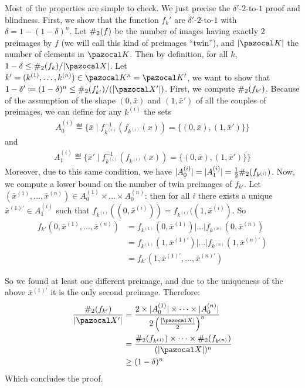 \begin{proofE}
  Most of the properties are simple to check. We just precise the $\delta'$-$2$-to-$1$ proof and blindness. First, we show that the function $f_k'$ are $\delta'$-$2$-to-$1$ with $\delta = 1-(1-\delta)^n$. Let $\#_2(f)$ be the number of images having exactly $2$ preimages by $f$ (we will call this kind of preimages ``twin''), and $|\cK|$ the number of elements in $\cK$. Then by definition, for all $k$, $1- \delta \leq \diese_2(f_k)/|\cX|$. Let $k' = (k^{(1)},\dots,k^{(n)}) \in \cK^n = \cK'$, we want to show that $1-\delta'\eqdef (1-\delta)^n \leq \diese_2(f_{k'}')/(|\cX'|)$. First, we compute $\#_2(f_{k'})$. Because of the assumption of the shape $(0,\bar{x})$ and $(1,\bar{x}')$ of all the couples of preimages, we can define for any $k^{(i)}$ the sets
  \begin{align}
    A_0^{(i)} \eqdef \{\bar{x} \mid f_{k^{(i)}}^{-1}(f_{k^{(i)}}(x)) = \{(0,\bar{x}), (1,\bar{x}')\}\}
  \end{align}
  and
  \begin{align}
    A_1^{(i)} \eqdef \{\bar{x}' \mid f_{k^{(i)}}^{-1}(f_{k^{(i)}}(x)) = \{(0,\bar{x}), (1,\bar{x}')\}\}
  \end{align}
  Moreover, due to this same condition, we have $|A_0^{(i)}| = |A_1^{(i)}| = \tfrac12 \#_2(f_{k^{(i)}})$. Now, we compute a lower bound on the number of twin preimages of $f_{k'}$. Let $(\bar{x}^{(1)}, \dots, \bar{x}^{(n)}) \in A_0^{(1)} \times \dots \times A_0^{(n)}$: then for all $i$ there exists a unique $\bar{x}^{(1)\prime} \in A_1^{(i)}$ such that $f_{k^{(i)}}((0,\bar{x}^{(i)})) = f_{k^{(i)}}((1,\bar{x}^{(i)})$. So
  \begin{align}
    f_{k'}(0,\bar{x}^{(1)},\dots,\bar{x}^{(n)})
    &= f_{k^{(1)}}(0,\bar{x}^{(1)}) | \dots |f_{k^{(n)}}(0,\bar{x}^{(n)})\\
    &= f_{k^{(1)}}(1,\bar{x}^{(1)\prime}) | \dots |f_{k^{(n)}}(1,\bar{x}^{(n)\prime})\\
    &= f_{k'}(1,\bar{x}^{(1)\prime},\dots,\bar{x}^{(n)\prime})
  \end{align}

  So we found at least one different preimage, and due to the uniqueness of the above $\bar{x}^{(1)\prime}$ it is the only second preimage. Therefore:
  \begin{align}
    \frac{\diese_2(f_{k'})}{|\cX'|}
    &= \frac{2 \times |A_0^{(1)}| \times \dots \times |A_0^{(n)}|}{2 \left(\frac{|\cX|}{2}\right)^n}\\
    &= \frac{\diese_2(f_{k^{(1)}}) \times \dots \times \diese_2(f_{k^{(n)}})}{(|\cX|)^n}\\
    &\geq (1-\delta)^n
  \end{align}
  Which concludes the proof.


\end{proofE}
